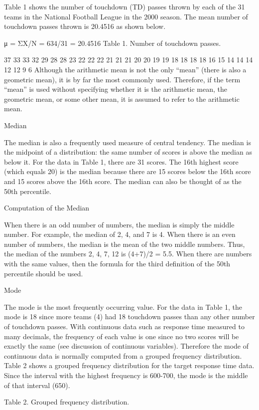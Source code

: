 \documentclass[
]{book}
\begin{document}
Table 1 shows the number of touchdown (TD) passes thrown by each of the 31 teams in the National Football League in the 2000 season. The mean number of touchdown passes thrown is 20.4516 as shown below.

μ = ΣX/N
= 634/31
= 20.4516
Table 1. Number of touchdown passes.

37 33 33 32 29 28 28 23 22 22 22 21 21 21 20 20 19 19 18 18 18 18 16 15 14 14 14 12 12 9 6
Although the arithmetic mean is not the only ``mean'' (there is also a geometric mean), it is by far the most commonly used. Therefore, if the term ``mean'' is used without specifying whether it is the arithmetic mean, the geometric mean, or some other mean, it is assumed to refer to the arithmetic mean.

Median

The median is also a frequently used measure of central tendency. The median is the midpoint of a distribution: the same number of scores is above the median as below it. For the data in Table 1, there are 31 scores. The 16th highest score (which equals 20) is the median because there are 15 scores below the 16th score and 15 scores above the 16th score. The median can also be thought of as the 50th percentile.

Computation of the Median

When there is an odd number of numbers, the median is simply the middle number. For example, the median of 2, 4, and 7 is 4. When there is an even number of numbers, the median is the mean of the two middle numbers. Thus, the median of the numbers 2, 4, 7, 12 is (4+7)/2 = 5.5. When there are numbers with the same values, then the formula for the third definition of the 50th percentile should be used.

Mode

The mode is the most frequently occurring value. For the data in Table 1, the mode is 18 since more teams (4) had 18 touchdown passes than any other number of touchdown passes. With continuous data such as response time measured to many decimals, the frequency of each value is one since no two scores will be exactly the same (see discussion of continuous variables). Therefore the mode of continuous data is normally computed from a grouped frequency distribution. Table 2 shows a grouped frequency distribution for the target response time data. Since the interval with the highest frequency is 600-700, the mode is the middle of that interval (650).

Table 2. Grouped frequency distribution.
\end{document}
